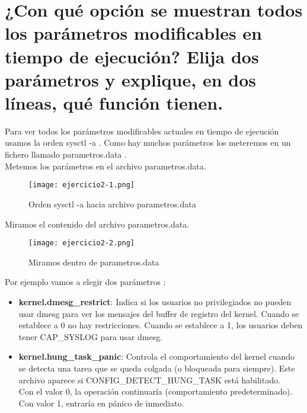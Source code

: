 	
	
	\section{¿Con qué opción se muestran todos los parámetros modificables en tiempo de ejecución? Elija dos parámetros y explique, en dos líneas, qué función tienen.}
	
	Para ver todos los parámetros modificables actuales en tiempo de ejecución usamos la orden sysctl -a \cite{ejercicio1-1}. Como hay muchos parámetros los meteremos en un fichero llamado parametros.data .\\
	
	Metemos los parámetros en el archivo parametros.data.
		\begin{figure}[H] 
			\centering
			\texttt{[image: ejercicio2-1.png]} 
			\label{figura10} 
			\caption{Orden sysctl -a hacia archivo parametros.data}
		\end{figure}
	
	Miramos el contenido del archivo parametros.data.
	\begin{figure}[H] 
		\centering
		\texttt{[image: ejercicio2-2.png]} 
		\label{figura11} 
		\caption{Miramos dentro de parametros.data}
	\end{figure}
	
	Por ejemplo vamos a elegir dos parámetros \cite{ejercicio2-1}:
	\begin{itemize}
		\item \textbf{kernel.dmesg\_restrict}: Indica si los usuarios no privilegiados no pueden usar dmesg para ver los mensajes del buffer de registro del kernel. Cuando se establece a 0 no hay restricciones. Cuando se establece a 1, los usuarios deben tener CAP\_SYSLOG para usar dmesg.
		\item \textbf{kernel.hung\_task\_panic}: Controla el comportamiento del kernel cuando se detecta una tarea que se queda colgada (o bloqueada para siempre). Este archivo aparece si CONFIG\_DETECT\_HUNG\_TASK está habilitado.\\
		Con el valor 0, la operación continuaría (comportamiento predeterminado).\\
		Con valor 1, entraría en pánico de inmediato.
	\end{itemize}
	
